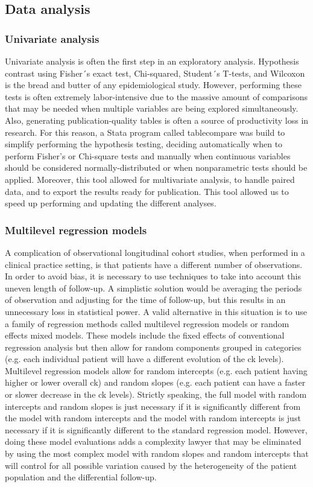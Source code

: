 \subsection{Data analysis}
\subsubsection{Univariate analysis}
Univariate analysis is often the first step in an exploratory analysis. Hypothesis contrast using Fisher´s exact test, Chi-squared, Student´s T-tests, and Wilcoxon is the bread and butter of any epidemiological study. However, performing these tests is often extremely labor-intensive due to the massive amount of comparisons that may be needed when multiple variables are being explored simultaneously. Also, generating publication-quality tables is often a source of productivity loss in research. For this reason, a Stata program called table\textunderscore compare was build to simplify performing the hypothesis testing, deciding automatically when to perform Fisher's or Chi-square tests and manually when continuous variables should be considered normally-distributed or when nonparametric tests should be applied. Moreover, this tool allowed for multivariate analysis, to handle paired data, and to export the results ready for publication. This tool allowed us to speed up performing and updating the different analyses.

\subsubsection{Multilevel regression models}
A complication of observational longitudinal cohort studies, when performed in a clinical practice setting, is that patients have a different number of observations. In order to avoid bias, it is necessary to use techniques to take into account this uneven length of follow-up. A simplistic solution would be averaging the periods of observation and adjusting for the time of follow-up, but this results in an unnecessary loss in statistical power. A valid alternative in this situation is to use a family of regression methods called multilevel regression models or random effects mixed models. These models include the fixed effects of conventional regression analysis but then allow for random components grouped in categories (e.g. each individual patient will have a different evolution of the \gls{ck} levels). Multilevel regression models allow for random intercepts (e.g. each patient having higher or lower overall \gls{ck}) and random slopes (e.g. each patient can have a faster or slower decrease in the \gls{ck} levels). Strictly speaking, the full model with random intercepts and random slopes is just necessary if it is significantly different from the model with random intercepts and the model with random intercepts is just necessary if it is significantly different to the standard regression model. However, doing these model evaluations adds a complexity lawyer that may be eliminated by using the most complex model with random slopes and random intercepts that will control for all possible variation caused by the heterogeneity of the patient population and the differential follow-up.

